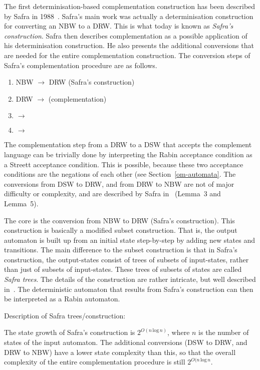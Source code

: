 The first determinisation-based complementation construction has been described by Safra in 1988~\cite{1988_safra_2}. Safra's main work was actually a determinisation construction for converting an NBW to a DRW. This is what today is known as \textit{Safra's construction}. Safra then describes complementation as a possible application of his determinisation construction. He also presents the additional conversions that are needed for the entire complementation construction. The conversion steps of Safra's complementation procedure are as follows.
\begin{enumerate}
\item NBW           $\longrightarrow$ DRW           (Safra's construction)
\item DRW           $\longrightarrow$  (complementation)
\item {} $\longrightarrow$ 
\item {} $\longrightarrow$ 
\end{enumerate}

The complementation step from a DRW to a DSW that accepts the complement language can be trivially done by interpreting the Rabin acceptance condition as a Streett acceptance condition. This is possible, because these two acceptance conditions are the negations of each other (see Section~\ref{om-automata}. The conversions from DSW to DRW, and from DRW to NBW are not of major difficulty or complexity, and are described by Safra in~\cite{1988_safra_2} (Lemma~3 and Lemma~5).

The core is the conversion from NBW to DRW (Safra's construction). This construction is basically a modified subset construction. That is, the output automaton is built up from an initial state step-by-step by adding new states and transitions. The main difference to the subset construction is that in Safra's construction, the output-states consist of trees of subsets of input-states, rather than just of subsets of input-states. These trees of subsets of states are called \textit{Safra trees}. The details of the construction are rather intricate, but well described in~\cite{1988_safra_2}. The deterministic automaton that results from Safra's construction can then be interpreted as a Rabin automaton.

Description of Safra trees/construction: \cite{2006_althoff}~\cite{2002_roggenbach}

The state growth of Safra's construction is $2^{O\left(n\, \text{log}\, n\right)}$, where $n$ is the number of states of the input automaton. The additional conversions (DSW to DRW, and DRW to NBW) have a lower state complexity than this, so that the overall complexity of the entire complementation procedure is still $2^{O(n\, \text{log}\, n}$.

